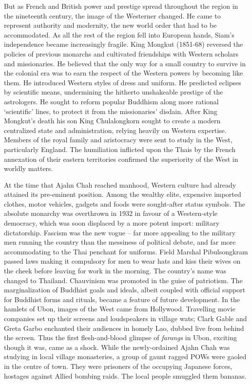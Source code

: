 But as French and British power and prestige spread throughout the
region in the nineteenth century, the image of the Westerner changed. He
came to represent authority and modernity, the new world order that had
to be accommodated. As all the rest of the region fell into European
hands, Siam's independence became increasingly fragile. King Mongkut
 (1851-68) reversed the policies of previous monarchs and cultivated
friendships with Western scholars and missionaries. He believed that the
only way for a small country to survive in the colonial era was to earn
the respect of the Western powers by becoming like them. He introduced
Western styles of dress and uniform. He predicted eclipses by scientific
means, undermining the hitherto unshakeable prestige of the astrologers. 
He sought to reform popular Buddhism along more rational `scientific'
lines, to protect it from the missionaries' disdain. After King
Mongkut's death his son King Chulalongkorn sought to create a modern
centralized state and administration, relying heavily on Western
expertise. Members of the royal family and aristocracy were sent to
study in the West, particularly England. The humiliation inflicted upon
the Thais by the French annexation of their eastern territories
confirmed the superiority of the West in worldly matters. 

At the time that Ajahn Chah reached manhood, Western culture had already
attained its pre-eminent position. Among the wealthy elite, expensive
imported clothes, motor vehicles, gadgets and foods were sought-after
status symbols. The absolute monarchy was overthrown in 1932 in favour
of a Western-style democracy, which was soon displaced by a more potent
import: military dictatorship. Fascism was the new vogue -- far more
appealing to the military men running the country than the messiness of
political debate, and far more accommodating to the Thai penchant for
uniforms. Field Marshal Pibulsongkram passed laws making it compulsory
for men to wear hats and kiss their wives on the cheek before leaving
for work in the morning. The country's name was changed to Thailand. 
Chauvinism was promoted in the guise of patriotism. The marginalization
of Buddhist goals and ideals, albeit coupled with official support for
Buddhist forms and rituals, became a feature of future development. In
the hamlets of Ubon, images of the West came from Hollywood. Travelling
movie companies set up their screens and loudspeakers in village wats; 
Clark Gable and Greta Garbo enchanted their audiences in homely Lao, 
dubbed live from behind the screen. Thus the first flesh-and-blood
glimpse of \emph{farangs} in Ubon, exciting though it was, came as a
shock. While the newly-ordained Ajahn Chah was studying in local village
monasteries, a group of gaunt ragged POWs were gaoled in the centre of
town. They were prisoners of the occupying Japanese forces, hostages
against Allied bombing raids. The local people smuggled them bananas. 

